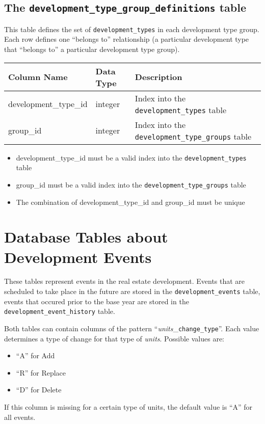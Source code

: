 \subsection{The {\tt development_type_group_definitions} table}

This table defines the set of \verb|development_types| in each
development type group. Each row defines one ``belongs to'' relationship (a
particular development type that ``belongs to'' a particular
development type group).

\begin{tabular}{lll}
\textbf{Column Name} & \textbf{Data Type} & \textbf{Description} \\

\hline
development_type_id & integer & Index into the \verb|development_types| table  \\
\hline
group_id & integer & Index into the \verb|development_type_groups| table  \\
\hline

\end{tabular}

\begin{itemize}
\tight
\item development_type_id must be a valid index into the \verb|development_types| table
\item group_id must be a valid index into the \verb|development_type_groups| table
\item The combination of development_type_id and group_id must be unique

\end{itemize}



\section{Database Tables about Development Events}
\label{sec:db-tables-events}

These tables represent events in the real estate development. Events that are scheduled 
to take place in the future are stored in the {\tt development_events} table,
events that occured prior to the base year are stored in the {\tt development_event_history} table.

Both tables can contain columns of the pattern ``{\it units}_{\tt change_type}''. Each value determines
a type of change for that type of {\it units}. Possible values are:
\begin{itemize} \tight
\item ``A'' for Add
\item ``R'' for Replace
\item ``D'' for Delete
\end{itemize}
If this column is missing for a certain type of units, the default value is ``A'' for all events.

